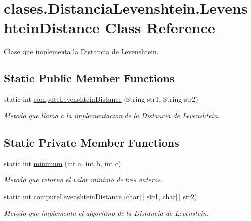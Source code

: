 \hypertarget{classclases_1_1_distancia_levenshtein_1_1_levenshtein_distance}{}\section{clases.\+Distancia\+Levenshtein.\+Levenshtein\+Distance Class Reference}
\label{classclases_1_1_distancia_levenshtein_1_1_levenshtein_distance}


Clase que implementa la Distancia de Levenshtein.  


\subsection*{Static Public Member Functions}
\begin{DoxyCompactItemize}
\item 
static int \hyperlink{classclases_1_1_distancia_levenshtein_1_1_levenshtein_distance_a32fafec4e825f1e645f3edb717515098}{compute\+Levenshtein\+Distance} (String str1, String str2)
\begin{DoxyCompactList}\small\item\em Metodo que llama a la implementacion de la Distancia de Levenshtein. \end{DoxyCompactList}\end{DoxyCompactItemize}
\subsection*{Static Private Member Functions}
\begin{DoxyCompactItemize}
\item 
static int \hyperlink{classclases_1_1_distancia_levenshtein_1_1_levenshtein_distance_a670f5fdf074856d2fa62eaedb9b36cad}{minimum} (int a, int b, int c)
\begin{DoxyCompactList}\small\item\em Metodo que retorna el valor minimo de tres enteros. \end{DoxyCompactList}\item 
static int \hyperlink{classclases_1_1_distancia_levenshtein_1_1_levenshtein_distance_a5391113c57cf7ac23d8d7ab745a7e979}{compute\+Levenshtein\+Distance} (char\mbox{[}$\,$\mbox{]} str1, char\mbox{[}$\,$\mbox{]} str2)
\begin{DoxyCompactList}\small\item\em Metodo que implementa el algoritmo de la Distancia de Levenstein. \end{DoxyCompactList}\end{DoxyCompactItemize}


